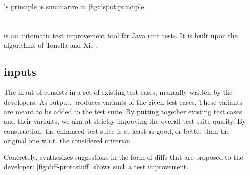 \dspot's principle is summarize in \autoref{fig:dspot:principle}.

\section{\dspot}

\dspot is an automatic test improvement tool for Java unit tests. It is built upon the algorithms of Tonella \cite{tonella} and Xie \cite{TaoXie2006}.

\subsection{\dspot inputs}

The input of \dspot consists in a set of existing test cases, manually written by the developers.
As output, \dspot produces variants of the given test cases. These variants are meant to be added to the test suite. By putting together existing test cases and their variants, we aim at strictly improving the overall test suite quality. By construction, the enhanced test suite is at least as good, or better than the original one w.r.t. the considered criterion.

Concretely, \dspot synthesizes suggestions in the form of diffs that are proposed to the developer: \autoref{fig:diff-protostuff} shows such a test improvement.  

